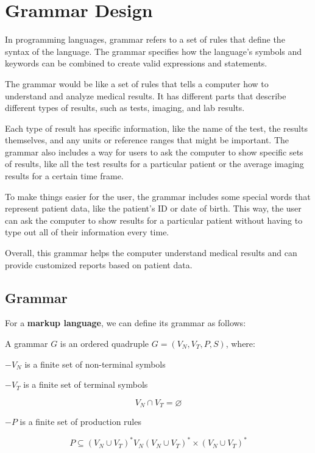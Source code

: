 \chapter{Grammar Design}

In programming languages, grammar refers to a set of rules that define the syntax of the language. The grammar specifies how the language's symbols and keywords can be combined to create valid expressions and statements.

The grammar would be like a set of rules that tells a computer how to understand and analyze medical results. It has different parts that describe different types of results, such as tests, imaging, and lab results.

Each type of result has specific information, like the name of the test, the results themselves, and any units or reference ranges that might be important. The grammar also includes a way for users to ask the computer to show specific sets of results, like all the test results for a particular patient or the average imaging results for a certain time frame.

To make things easier for the user, the grammar includes some special words that represent patient data, like the patient's ID or date of birth. This way, the user can ask the computer to show results for a particular patient without having to type out all of their information every time.

Overall, this grammar helps the computer understand medical results and can provide customized reports based on patient data.

\section{Grammar}
For a \textbf{markup language}, we can define its grammar as follows:

A grammar \(G\) is an ordered quadruple \(G = (V_{N}, V_{T}, P, S)\), where:

\( -V_{N}\) is a finite set of non-terminal symbols

\( -V_{T}\) is a finite set of terminal symbols

\begin{equation}
    V_{N}\cap V_{T} = \varnothing 
\end{equation} 

    \( -P\) is a finite set of production rules
    
\begin{equation}
    P\subseteq\left(V_{N}\cup V_{T}\right)^{\ast }V_{N}\left(V_{N}\cup V_{T}\right)^{\ast }\times\left(V_{N}\cup V_{T}\right)^{\ast }
\end{equation}

